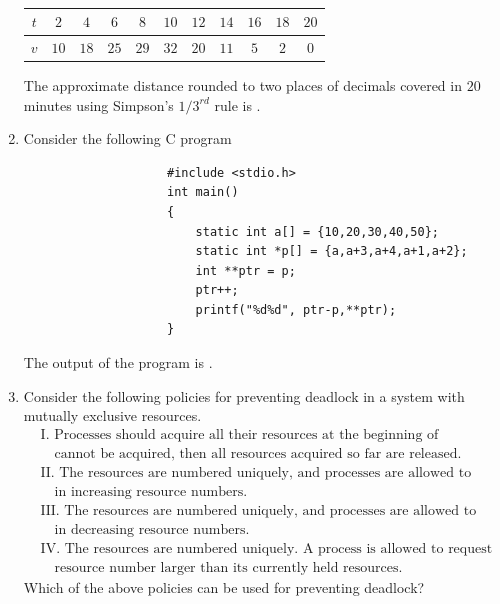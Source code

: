 \documentclass[journal,12pt,onecolumn]{IEEEtran}
\theoremstyle{remark}
\begin{document}
\begin{enumerate}
				\begin{table}[h]
					\centering
					\caption*{}
					\label{tab:velocity}
					\begin{tabular}{|c|c|c|c|c|c|c|c|c|c|c|}
						\hline
						$t$ & $2$ & $4$ & $6$ & $8$ & $10$ & $12$ & $14$ & $16$ & $18$ & $20$ \\
						\hline
						$v$ & $10$ & $18$ & $25$ & $29$ & $32$ & $20$ & $11$ & $5$ & $2$ & $0$ \\
						\hline
					\end{tabular}
				\end{table}
				
				The approximate distance  rounded to two places of decimals covered in $20$ minutes using Simpson's $1/3^{rd}$ rule is \underline{\hspace{2cm}}.
				
				\hfill{}
				
				\item Consider the following C program
				\begin{verbatim}
					#include <stdio.h>
					int main()
					{
						static int a[] = {10,20,30,40,50};
						static int *p[] = {a,a+3,a+4,a+1,a+2};
						int **ptr = p;
						ptr++;
						printf("%d%d", ptr-p,**ptr);
					}
				\end{verbatim}
				The output of the program is \underline{\hspace{2cm}}.
				
				\hfill{}
				
				\item Consider the following policies for preventing deadlock in a system with mutually exclusive resources.
				\begin{align*}
					&\text{I. Processes should acquire all their resources at the beginning of execution. If any resources}\\
					&\quad \text{cannot be acquired, then all resources acquired so far are released.}\\
					&\text{II. The resources are numbered uniquely, and processes are allowed to request for resources only}\\
					&\quad \text{in increasing resource numbers.}\\
					&\text{III. The resources are numbered uniquely, and processes are allowed to request for resources only}\\
					&\quad \text{in decreasing resource numbers.}\\
					&\text{IV. The resources are numbered uniquely. A process is allowed to request only for a resource with}\\
					&\quad \text{resource number larger than its currently held resources.}
				\end{align*}
				Which of the above policies can be used for preventing deadlock?
				

\end{enumerate}
\end{document}
